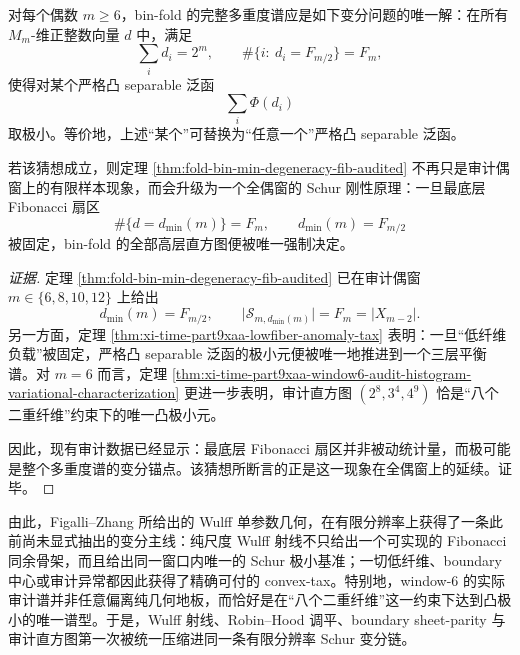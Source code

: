 \begin{conjecture}\label{conj:xi-time-part9xaa-even-window-fibonacci-schur-rigidity}
对每个偶数 \(m\ge 6\)，bin-fold 的完整多重度谱应是如下变分问题的唯一解：在所有 \(M_m\)-维正整数向量 \(d\) 中，满足
\[
\sum_i d_i=2^m,
\qquad
\#\{i:\ d_i=F_{m/2}\}=F_m,
\]
使得对某个严格凸 separable 泛函
\[
\sum_i \Phi(d_i)
\]
取极小。等价地，上述“某个”可替换为“任意一个”严格凸 separable 泛函。

若该猜想成立，则定理 \ref{thm:fold-bin-min-degeneracy-fib-audited} 不再只是审计偶窗上的有限样本现象，而会升级为一个全偶窗的 Schur 刚性原理：一旦最底层 Fibonacci 扇区
\[
\#\{d=d_{\min}(m)\}=F_m,
\qquad
d_{\min}(m)=F_{m/2}
\]
被固定，bin-fold 的全部高层直方图便被唯一强制决定。
\end{conjecture}
\begin{proof}[证据]
定理 \ref{thm:fold-bin-min-degeneracy-fib-audited} 已在审计偶窗 \(m\in\{6,8,10,12\}\) 上给出
\[
d_{\min}(m)=F_{m/2},
\qquad
\bigl|\mathcal S_{m,d_{\min}(m)}\bigr|=F_m=|X_{m-2}|.
\]
另一方面，定理 \ref{thm:xi-time-part9xaa-lowfiber-anomaly-tax} 表明：一旦“低纤维负载”被固定，严格凸 separable 泛函的极小元便被唯一地推进到一个三层平衡谱。对 \(m=6\) 而言，定理 \ref{thm:xi-time-part9xaa-window6-audit-histogram-variational-characterization} 更进一步表明，审计直方图 \((2^8,3^4,4^9)\) 恰是“八个二重纤维”约束下的唯一凸极小元。

因此，现有审计数据已经显示：最底层 Fibonacci 扇区并非被动统计量，而极可能是整个多重度谱的变分锚点。该猜想所断言的正是这一现象在全偶窗上的延续。证毕。
\end{proof}

\noindent
由此，Figalli--Zhang 所给出的 Wulff 单参数几何，在有限分辨率上获得了一条此前尚未显式抽出的变分主线：纯尺度 Wulff 射线不只给出一个可实现的 Fibonacci 同余骨架，而且给出同一窗口内唯一的 Schur 极小基准；一切低纤维、boundary 中心或审计异常都因此获得了精确可付的 convex-tax。特别地，window-\(6\) 的实际审计谱并非任意偏离纯几何地板，而恰好是在“八个二重纤维”这一约束下达到凸极小的唯一谱型。于是，Wulff 射线、Robin--Hood 调平、boundary sheet-parity 与审计直方图第一次被统一压缩进同一条有限分辨率 Schur 变分链。

\endinput
